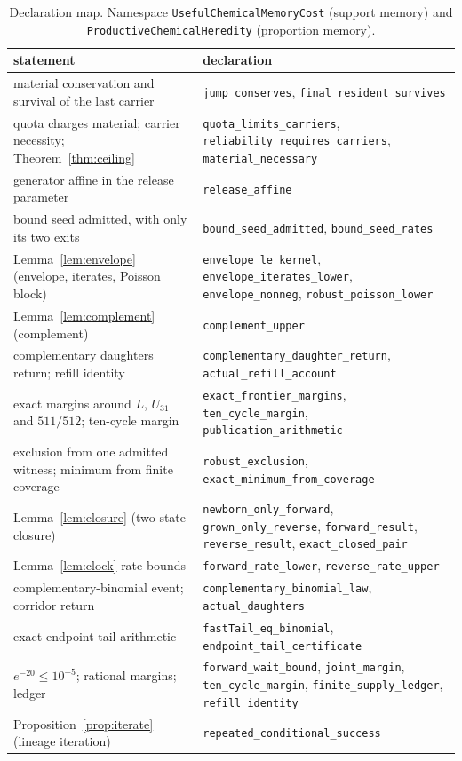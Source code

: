 \documentclass[11pt]{article}
\theoremstyle{plain}
\theoremstyle{definition}
\theoremstyle{remark}
\begin{document}
\begin{table}[t]
\centering\small
\caption{Declaration map. Namespace \texttt{UsefulChemicalMemoryCost} (support
memory) and \texttt{ProductiveChemicalHeredity} (proportion memory).}
\label{tab:lean}
\begin{tabular}{>{\raggedright\arraybackslash}p{}>{\raggedright\arraybackslash}p{}}
\toprule
statement & declaration\\
\midrule
material conservation and survival of the last carrier &
\texttt{jump\_conserves}, \texttt{final\_resident\_survives}\\
quota charges material; carrier necessity; Theorem~\ref{thm:ceiling} &
\texttt{quota\_limits\_carriers}, \texttt{reliability\_requires\_carriers},
\texttt{material\_necessary}\\
generator affine in the release parameter &
\texttt{release\_affine}\\
bound seed admitted, with only its two exits &
\texttt{bound\_seed\_admitted}, \texttt{bound\_seed\_rates}\\
Lemma~\ref{lem:envelope} (envelope, iterates, Poisson block) &
\texttt{envelope\_le\_kernel}, \texttt{envelope\_iterates\_lower},
\texttt{envelope\_nonneg}, \texttt{robust\_poisson\_lower}\\
Lemma~\ref{lem:complement} (complement) & \texttt{complement\_upper}\\
complementary daughters return; refill identity &
\texttt{complementary\_daughter\_return}, \texttt{actual\_refill\_account}\\
exact margins around $L$, $U_{31}$ and $511/512$; ten-cycle margin &
\texttt{exact\_frontier\_margins}, \texttt{ten\_cycle\_margin},
\texttt{publication\_arithmetic}\\
exclusion from one admitted witness; minimum from finite coverage &
\texttt{robust\_exclusion}, \texttt{exact\_minimum\_from\_coverage}\\
\midrule
Lemma~\ref{lem:closure} (two-state closure) &
\texttt{newborn\_only\_forward}, \texttt{grown\_only\_reverse},
\texttt{forward\_result}, \texttt{reverse\_result},
\texttt{exact\_closed\_pair}\\
Lemma~\ref{lem:clock} rate bounds &
\texttt{forward\_rate\_lower}, \texttt{reverse\_rate\_upper}\\
complementary-binomial event; corridor return &
\texttt{complementary\_binomial\_law}, \texttt{actual\_daughters}\\
exact endpoint tail arithmetic &
\texttt{fastTail\_eq\_binomial}, \texttt{endpoint\_tail\_certificate}\\
$e^{-20}\le10^{-5}$; rational margins; ledger &
\texttt{forward\_wait\_bound}, \texttt{joint\_margin},
\texttt{ten\_cycle\_margin}, \texttt{finite\_supply\_ledger},
\texttt{refill\_identity}\\
Proposition~\ref{prop:iterate} (lineage iteration) &
\texttt{repeated\_conditional\_success}\\
\bottomrule
\end{tabular}
\end{table}
\end{document}

